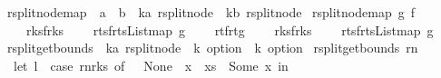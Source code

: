 \begin{isabellebody}
\isanewline
{}\isamarkupfalse%
\ rsplit{\isacharunderscore}node{\isacharunderscore}map\ {\isacharcolon}{\isacharcolon}\ {\isachardoublequoteopen}{\isacharparenleft}{\isacharprime}a\ {\isasymRightarrow}\ {\isacharprime}b{\isacharparenright}\ {\isasymRightarrow}\ {\isacharparenleft}{\isacharprime}k{\isacharcomma}{\isacharprime}a{\isacharparenright}\ rsplit{\isacharunderscore}node\ {\isasymRightarrow}\ {\isacharparenleft}{\isacharprime}k{\isacharcomma}{\isacharprime}b{\isacharparenright}\ rsplit{\isacharunderscore}node{\isachardoublequoteclose}\ \isanewline
{\isachardoublequoteopen}rsplit{\isacharunderscore}node{\isacharunderscore}map\ g\ f\ {\isacharequal}\ {\isacharparenleft}\isanewline
\ \ {\isasymlparr}\isanewline
\ \ \ \ r{\isacharunderscore}ks{}{\isacharequal}{\isacharparenleft}f{\isacharbar}{\isachargreater}r{\isacharunderscore}ks{}{\isacharparenright}{\isacharcomma}\isanewline
\ \ \ \ r{\isacharunderscore}ts{}{\isacharequal}{\isacharparenleft}f{\isacharbar}{\isachargreater}r{\isacharunderscore}ts{}{\isacharbar}{\isachargreater}List{\isachardot}map\ g{\isacharparenright}{\isacharcomma}\isanewline
\ \ \ \ r{\isacharunderscore}t{\isacharequal}{\isacharparenleft}f{\isacharbar}{\isachargreater}r{\isacharunderscore}t{\isacharbar}{\isachargreater}g{\isacharparenright}{\isacharcomma}\isanewline
\ \ \ \ r{\isacharunderscore}ks{}{\isacharequal}{\isacharparenleft}f{\isacharbar}{\isachargreater}r{\isacharunderscore}ks{}{\isacharparenright}{\isacharcomma}\isanewline
\ \ \ \ r{\isacharunderscore}ts{}{\isacharequal}{\isacharparenleft}f{\isacharbar}{\isachargreater}r{\isacharunderscore}ts{}{\isacharbar}{\isachargreater}List{\isachardot}map\ g{\isacharparenright}\isanewline
\ \ {\isasymrparr}{\isacharparenright}{\isachardoublequoteclose}\isanewline
\isanewline
\isanewline
\isanewline
\isanewline
{}\isamarkupfalse%
\ rsplit{\isacharunderscore}get{\isacharunderscore}bounds\ {\isacharcolon}{\isacharcolon}\ {\isachardoublequoteopen}{\isacharparenleft}{\isacharprime}k{\isacharcomma}{\isacharprime}a{\isacharparenright}\ rsplit{\isacharunderscore}node\ {\isasymRightarrow}\ {\isacharparenleft}{\isacharprime}k\ option\ {\isacharasterisk}\ {\isacharprime}k\ option{\isacharparenright}{\isachardoublequoteclose}\ \isanewline
{\isachardoublequoteopen}rsplit{\isacharunderscore}get{\isacharunderscore}bounds\ rn\ {\isacharequal}\ {\isacharparenleft}\isanewline
\ \ let\ l\ {\isacharequal}\ case\ rn{\isacharbar}{\isachargreater}r{\isacharunderscore}ks{}\ of\ {\isacharbrackleft}{\isacharbrackright}\ {\isasymRightarrow}\ None\ {\isacharbar}\ x\ {\isacharhash}\ xs\ {\isasymRightarrow}\ Some\ x\ in\isanewline

\end{isabellebody}
